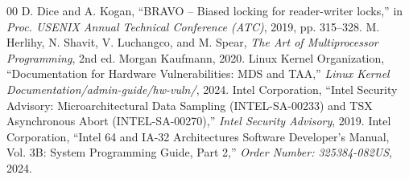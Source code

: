 \documentclass[conference]{IEEEtran}
\begin{document}
\begin{thebibliography}{00}
 D. Dice and A. Kogan, ``BRAVO -- Biased locking for reader-writer locks,'' in \textit{Proc. USENIX Annual Technical Conference (ATC)}, 2019, pp. 315--328.
 M. Herlihy, N. Shavit, V. Luchangco, and M. Spear, \textit{The Art of Multiprocessor Programming}, 2nd ed. Morgan Kaufmann, 2020.
 Linux Kernel Organization, ``Documentation for Hardware Vulnerabilities: MDS and TAA,'' \textit{Linux Kernel Documentation/admin-guide/hw-vuln/}, 2024.
 Intel Corporation, ``Intel Security Advisory: Microarchitectural Data Sampling (INTEL-SA-00233) and TSX Asynchronous Abort (INTEL-SA-00270),'' \textit{Intel Security Advisory}, 2019.
 Intel Corporation, ``Intel 64 and IA-32 Architectures Software Developer's Manual, Vol. 3B: System Programming Guide, Part 2,'' \textit{Order Number: 325384-082US}, 2024.
\end{thebibliography}
\end{document}
